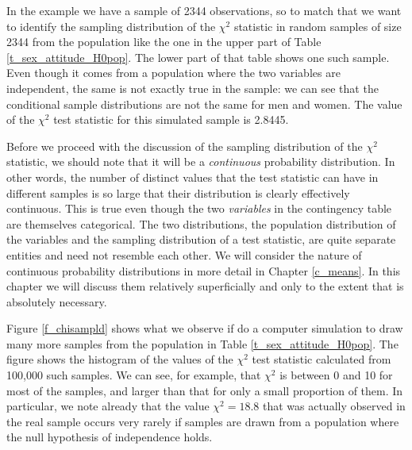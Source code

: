 In the example we have a sample of 2344 observations, so to match that
we want to identify the sampling distribution of the $\chi^{2}$
statistic in random samples of size 2344 from the population like the
one in the upper part of Table \ref{t_sex_attitude_H0pop}. The lower
part of that table shows one such sample. Even though it comes from a
population where the two variables are independent, the same is not
exactly true in the sample: we can see that the conditional sample
distributions are not the same for men and women. The value of the
$\chi^{2}$ test statistic for this simulated sample is 2.8445.

Before we proceed with the discussion of the sampling distribution of
the $\chi^{2}$ statistic, we should note that it will be a
\emph{continuous} probability distribution. In other words, the number
of distinct values that the test statistic can have in different samples
is so large that their distribution is clearly effectively continuous.
This is true even though the two \emph{variables} in the contingency
table are themselves categorical. The two distributions, the population
distribution of the variables and the sampling distribution of a test
statistic, are quite separate entities and need not resemble each other.
We will consider the nature of continuous probability distributions in
more detail in Chapter \ref{c_means}. In this chapter we will discuss
them relatively superficially and only to the extent that is absolutely
necessary.

Figure \ref{f_chisampld} shows what we observe if do a computer
simulation to draw many more samples from the population in Table
\ref{t_sex_attitude_H0pop}. The figure shows the histogram of the values
of the $\chi^{2}$ test statistic calculated from 100,000 such samples.
We can see, for example,  that $\chi^{2}$ is between 0 and 10 for most of the samples,
and larger than that for only a small proportion of them. In
particular, we note already that the value $\chi^{2}=18.8$ that was
actually observed in the real sample occurs very rarely if samples are
drawn from a population where the null hypothesis of independence holds.


